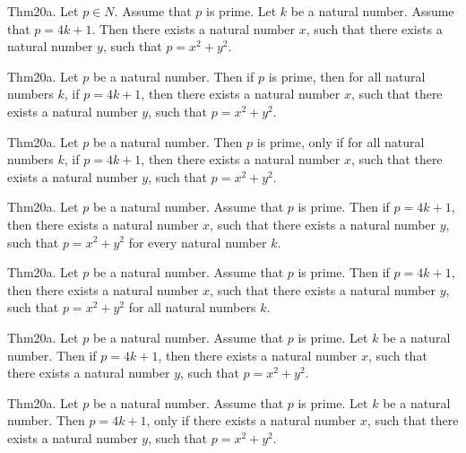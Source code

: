 \documentclass{article}
\begin{document}
Thm20a. Let $p \in N$. Assume that $p$ is prime. Let $k$ be a natural number. Assume that $p = 4 k + 1$. Then there exists a natural number $x$, such that there exists a natural number $y$, such that $p = x ^{ 2}+ y ^{ 2}$.

Thm20a. Let $p$ be a natural number. Then if $p$ is prime, then for all natural numbers $k$, if $p = 4 k + 1$, then there exists a natural number $x$, such that there exists a natural number $y$, such that $p = x ^{ 2}+ y ^{ 2}$.

Thm20a. Let $p$ be a natural number. Then $p$ is prime, only if for all natural numbers $k$, if $p = 4 k + 1$, then there exists a natural number $x$, such that there exists a natural number $y$, such that $p = x ^{ 2}+ y ^{ 2}$.

Thm20a. Let $p$ be a natural number. Assume that $p$ is prime. Then if $p = 4 k + 1$, then there exists a natural number $x$, such that there exists a natural number $y$, such that $p = x ^{ 2}+ y ^{ 2}$ for every natural number $k$.

Thm20a. Let $p$ be a natural number. Assume that $p$ is prime. Then if $p = 4 k + 1$, then there exists a natural number $x$, such that there exists a natural number $y$, such that $p = x ^{ 2}+ y ^{ 2}$ for all natural numbers $k$.

Thm20a. Let $p$ be a natural number. Assume that $p$ is prime. Let $k$ be a natural number. Then if $p = 4 k + 1$, then there exists a natural number $x$, such that there exists a natural number $y$, such that $p = x ^{ 2}+ y ^{ 2}$.

Thm20a. Let $p$ be a natural number. Assume that $p$ is prime. Let $k$ be a natural number. Then $p = 4 k + 1$, only if there exists a natural number $x$, such that there exists a natural number $y$, such that $p = x ^{ 2}+ y ^{ 2}$.
\end{document}
